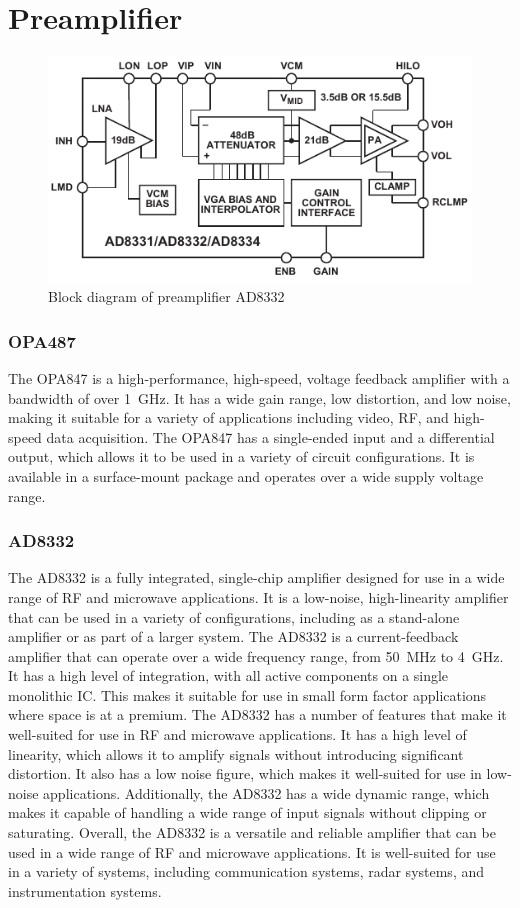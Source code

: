 \section{Preamplifier}
\begin{figure}[htbp]
	\centering
	\includegraphics[width=.8\textwidth]{Figures/3_ad8332_block.pdf}
	\caption{Block diagram of preamplifier AD8332 \cite{AD8332}}
	\label{fig:3_preamplifier_block}
\end{figure}

\subsubsection{OPA487}
The OPA847\cite{OPA847} is a high-performance, high-speed, voltage feedback amplifier with a bandwidth of over \qty{1}{\giga\hertz}. It has a wide gain range, low distortion, and low noise, making it suitable for a variety of applications including video, RF, and high-speed data acquisition. The OPA847 has a single-ended input and a differential output, which allows it to be used in a variety of circuit configurations. It is available in a surface-mount package and operates over a wide supply voltage range.

\subsubsection{AD8332}
The AD8332\cite{AD8332} is a fully integrated, single-chip amplifier designed for use in a wide range of RF and microwave applications. It is a low-noise, high-linearity amplifier that can be used in a variety of configurations, including as a stand-alone amplifier or as part of a larger system. The AD8332 is a current-feedback amplifier that can operate over a wide frequency range, from \qty{50}{\mega\hertz} to \qty{4}{\giga\hertz}. It has a high level of integration, with all active components on a single monolithic IC. This makes it suitable for use in small form factor applications where space is at a premium. The AD8332 has a number of features that make it well-suited for use in RF and microwave applications. It has a high level of linearity, which allows it to amplify signals without introducing significant distortion. It also has a low noise figure, which makes it well-suited for use in low-noise applications. Additionally, the AD8332 has a wide \gls{dynamic range}, which makes it capable of handling a wide range of input signals without clipping or saturating. Overall, the AD8332 is a versatile and reliable amplifier that can be used in a wide range of RF and microwave applications. It is well-suited for use in a variety of systems, including communication systems, radar systems, and instrumentation systems.


